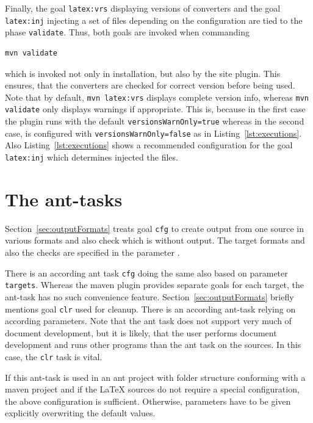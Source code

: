 Finally, the goal \texttt{latex:vrs} displaying versions of converters 
and the goal \texttt{latex:inj} injecting a set of files 
depending on the configuration 
are tied to the phase \texttt{validate}. 
Thus, both goals are invoked when commanding
%
\begin{Verbatim}[fontsize=\scriptsize]
mvn validate
\end{Verbatim}
%
which is invoked not only in installation, but also by the site plugin.
This ensures, that the converters are checked for correct version
before being used. 
Note that by default, \texttt{mvn latex:vrs} displays complete version info,
whereas \texttt{mvn validate} only displays warnings if appropriate. 
This is, because in the first case the plugin runs with the default \texttt{versionsWarnOnly=true} 
whereas in the second case, is configured with \texttt{versionsWarnOnly=false} 
as in Listing~\ref{lst:executions}. 
Also Listing~\ref{lst:executions} shows a recommended configuration 
for the goal \texttt{latex:inj} which determines injected the files. 




\section{The ant-tasks}\label{sec:usageAntTask}


Section~\ref{sec:outputFormats} treats goal \texttt{cfg} 
to create output from one source in various formats 
and also check which is without output. 
The target formats and also the checks are specified in the parameter . 

There is an according ant task \texttt{cfg} 
doing the same also based on parameter \texttt{targets}. 
Whereas the maven plugin provides separate goals for each target, 
the ant-task has no such convenience feature. 
Section~\ref{sec:outputFormats} briefly mentions goal \texttt{clr} 
used for cleanup. 
There is an according ant-task relying on according parameters. 
Note that the ant task does not support very much of document development, 
but it is likely, that the user performs document development 
and runs other programs than the ant task on the sources. 
In this case, the \texttt{clr} task is vital. 


If this ant-task is used in an ant project 
with folder structure conforming with a maven project 
and if the \LaTeX{} sources do not require a special configuration, 
the above configuration is sufficient. 
Otherwise, parameters have to be given explicitly 
overwriting the default values. 

